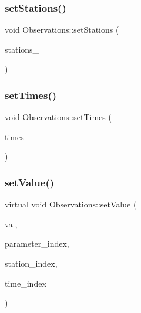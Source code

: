 \mbox{\label{class_observations_a01ddf7eb5d0b9c3fec31731a931cfdf4}} 
\subsubsection{\texorpdfstring{set\+Stations()}{setStations()}}
{\footnotesize\ttfamily void Observations\+::set\+Stations (\begin{DoxyParamCaption}\item[{\mbox{\hyperlink{classanen_sta_1_1_stations}{anen\+Sta\+::\+Stations}}}]{stations\+\_\+ }\end{DoxyParamCaption})}

\mbox{\label{class_observations_a28c65d41c60cb95607e06d090d03a8d2}} 
\subsubsection{\texorpdfstring{set\+Times()}{setTimes()}}
{\footnotesize\ttfamily void Observations\+::set\+Times (\begin{DoxyParamCaption}\item[{\mbox{\hyperlink{classanen_time_1_1_times}{anen\+Time\+::\+Times}}}]{times\+\_\+ }\end{DoxyParamCaption})}

\mbox{\label{class_observations_a6f00b4a2277ce9e77cd0d5975f4066f8}} 
\subsubsection{\texorpdfstring{set\+Value()}{setValue()}\hspace{0.1cm}{\footnotesize\ttfamily [1/2]}}
{\footnotesize\ttfamily virtual void Observations\+::set\+Value (\begin{DoxyParamCaption}\item[{double}]{val,  }\item[{std\+::size\+\_\+t}]{parameter\+\_\+index,  }\item[{std\+::size\+\_\+t}]{station\+\_\+index,  }\item[{std\+::size\+\_\+t}]{time\+\_\+index }\end{DoxyParamCaption})\hspace{0.3cm}{\ttfamily [pure virtual]}}



